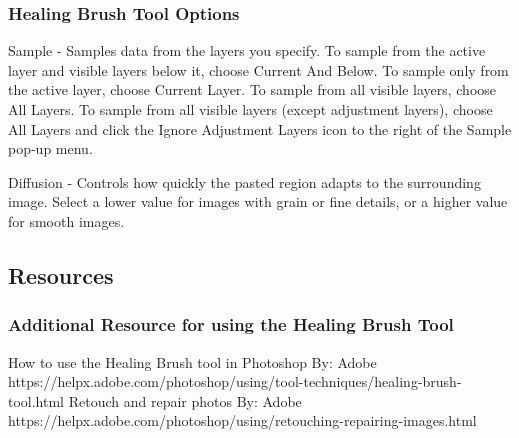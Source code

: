 \documentclass{beamer}
\begin{document}
			\begin{frame}
	\frametitle{Healing Brush Tool Options}
	\begin{outline}
		\1 Sample - 
		\2 Samples data from the layers you specify. 
		\2 To sample from the active layer and visible layers below it, choose Current And Below. 
		\2 To sample only from the active layer, choose Current Layer. 
		\2 To sample from all visible layers, choose All Layers. 
		\2 To sample from all visible layers (except adjustment layers), choose All Layers and click the Ignore Adjustment Layers icon to the right of the Sample pop‑up menu.
		
		\1 Diffusion - 
		\2 Controls how quickly the pasted region adapts to the surrounding image. 
		\2 Select a lower value for images with grain or fine details, or a higher value for smooth images.
	\end{outline}
\end{frame}
		
			\subsection{Resources}		
	\begin{frame}
		\frametitle{Additional Resource for using the Healing Brush Tool}
		\begin{outline}
			\1 How to use the Healing Brush tool in Photoshop
			\2 By:  Adobe 
			\2 https://helpx.adobe.com/photoshop/using/tool-techniques/healing-brush-tool.html
			\1 Retouch and repair photos
			\2 By:  Adobe 
			\2 https://helpx.adobe.com/photoshop/using/retouching-repairing-images.html
		\end{outline}
	\end{frame}



		\section{}
\end{document}
